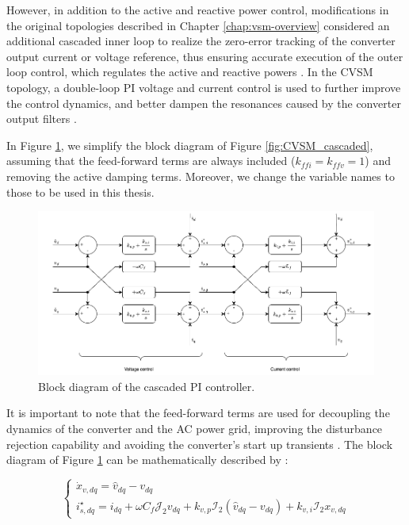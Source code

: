 However, in addition to the active and reactive power control, modifications in
the original topologies described in Chapter \ref{chap:vsm-overview} considered
an additional cascaded inner loop to realize the zero-error tracking of the
converter output current or voltage reference, thus ensuring accurate execution
of the outer loop control, which regulates the active and reactive powers
\cite{blaabjerg2018control}. In the CVSM topology, a double-loop PI voltage and
current control is used to further improve the control dynamics, and better
dampen the resonances caused by the converter output filters
\cite{darco2015vsm}.

In Figure \ref{fig:cascaded_pi}, we simplify the block diagram of Figure
\ref{fig:CVSM_cascaded}, assuming that the feed-forward terms are always
included ($k_{ffi} = k_{ffv} = 1$) and removing the active damping terms.
Moreover, we change the variable names to those to be used in this thesis.

\begin{figure}[ht!]
    \centering
    \includegraphics[width=12cm]{images/cascaded_pi.png}
    \caption{Block diagram of the cascaded PI controller.}
    \label{fig:cascaded_pi}
\end{figure}

It is important to note that the feed-forward terms are used for decoupling the
dynamics of the converter and the AC power grid, improving the disturbance
rejection capability and avoiding the converter's start up transients
\cite{yazdani2010voltage}. The block diagram of Figure \ref{fig:cascaded_pi} can
be mathematically described by \cite{darco2015vsm,tayyebi2020power}:

\begin{equation}
    \begin{cases}
        \dot{x}_{v,dq} = \hat{v}_{dq} - v_{dq}\\
        i_{s,dq}^{\star} = i_{dq} + \omega C_f \mathcal{J}_2 v_{dq} + k_{v,p}\mathcal{I}_2 (\hat{v}_{dq} - v_{dq}) + k_{v,i}\mathcal{I}_2 x_{v,dq} 
    \end{cases}
    \label{eq:voltage_control}
\end{equation}


